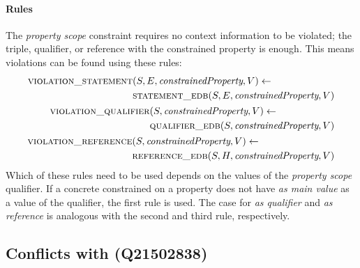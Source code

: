 \documentclass[hyperref,bachelorofscience,fleqn]{cgvpub}
\begin{document}
\paragraph{Rules}
The \emph{property scope} constraint requires no context information to be violated; the triple, qualifier, or reference with the constrained property is enough. This means violations can be found using these rules:
\begin{align}
\begin{split}
\textsc{violation\_statement}&(S, E, \emph{constrainedProperty}, V) \leftarrow \\
&\textsc{statement\_edb}(S, E, \emph{constrainedProperty}, V)\\
\end{split}\\
\begin{split}
\textsc{violation\_qualifier}&(S, \emph{constrainedProperty}, V) \leftarrow \\
&\textsc{qualifier\_edb}(S, \emph{constrainedProperty}, V)\\
\end{split}\\
\begin{split}
\textsc{violation\_reference}&(S, \emph{constrainedProperty}, V) \leftarrow \\
&\textsc{reference\_edb}(S, H, \emph{constrainedProperty}, V)\\
\end{split}
\end{align}
Which of these rules need to be used depends on the values of the \emph{property scope} qualifier. If a concrete constrained on a property does not have \emph{as main value} as a value of the qualifier, the first rule is used. The case for \emph{as qualifier} and \emph{as reference} is analogous with the second and third rule, respectively.

\subsection{Conflicts with (Q21502838)}
\end{document}
